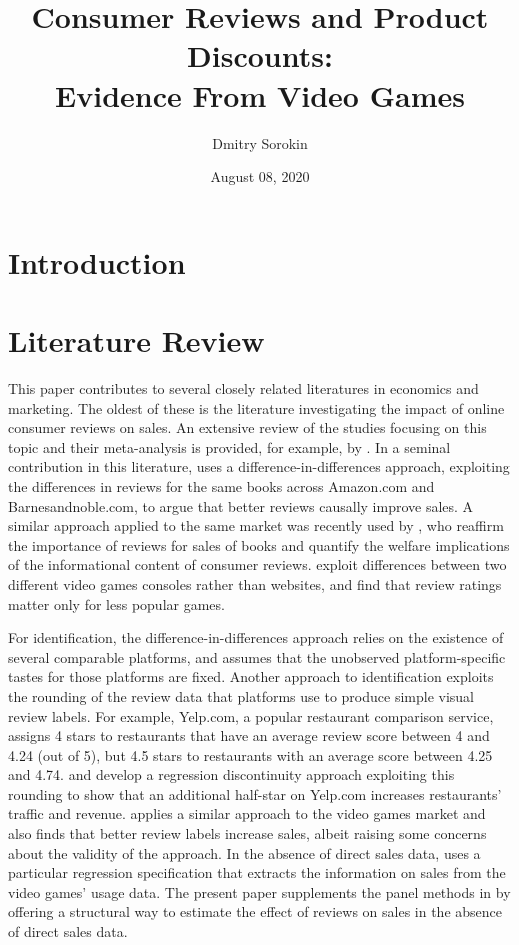 \documentclass[
  12pt,
  pagebackref]{article}
\title{Consumer Reviews and Product Discounts:\\
Evidence From Video Games}
\author{Dmitry Sorokin}
\date{August 08, 2020}
\begin{document}
\maketitle

\hypertarget{introduction}{%
\section{Introduction}\label{introduction}}

\hypertarget{literature-review}{%
\section{Literature Review}\label{literature-review}}

This paper contributes to several closely related literatures in
economics and marketing. The oldest of these is the literature
investigating the impact of online consumer reviews on sales. An
extensive review of the studies focusing on this topic and their
meta-analysis is provided, for example, by \citet{Floyd14}. In a seminal
contribution in this literature, \citet{ChevalierMayzlin06} uses a
difference-in-differences approach, exploiting the differences in
reviews for the same books across Amazon.com and Barnesandnoble.com, to
argue that better reviews causally improve sales. A similar approach
applied to the same market was recently used by
\citet{ReimersWaldfogel20}, who reaffirm the importance of reviews for
sales of books and quantify the welfare implications of the
informational content of consumer reviews. \citet{ZhuZhang10} exploit
differences between two different video games consoles rather than
websites, and find that review ratings matter only for less popular
games.

For identification, the difference-in-differences approach relies on the
existence of several comparable platforms, and assumes that the
unobserved platform-specific tastes for those platforms are fixed.
Another approach to identification exploits the rounding of the review
data that platforms use to produce simple visual review labels. For
example, Yelp.com, a popular restaurant comparison service, assigns 4
stars to restaurants that have an average review score between 4 and
4.24 (out of 5), but 4.5 stars to restaurants with an average score
between 4.25 and 4.74. \citet{AndersonMagruder12} and \citet{Luca16}
develop a regression discontinuity approach exploiting this rounding to
show that an additional half-star on Yelp.com increases restaurants'
traffic and revenue. \citet{SorokinStevens20} applies a similar approach
to the video games market and also finds that better review labels
increase sales, albeit raising some concerns about the validity of the
approach. In the absence of direct sales data, \citet{SorokinStevens20}
uses a particular regression specification that extracts the information
on sales from the video games' usage data. The present paper supplements
the panel methods in \citet{SorokinStevens20} by offering a structural
way to estimate the effect of reviews on sales in the absence of direct
sales data.
\end{document}
